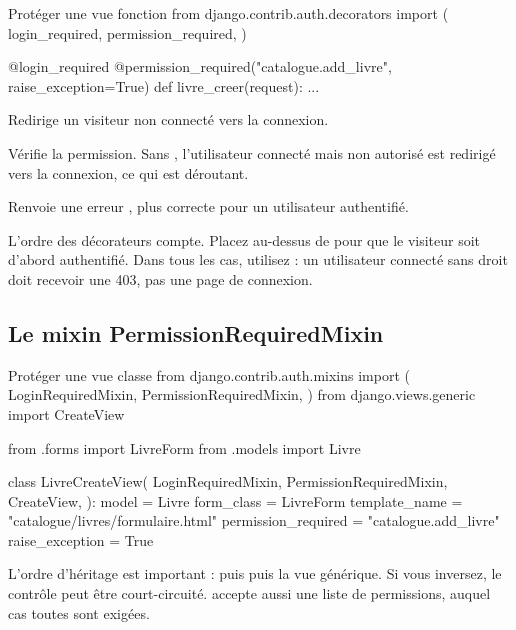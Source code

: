 \begin{codebox}[python]{Protéger une vue fonction}
from django.contrib.auth.decorators import (
    login_required,
    permission_required,
)


@login_required
@permission_required("catalogue.add_livre", raise_exception=True)
def livre_creer(request):
    ...
\end{codebox}

\begin{description}[leftmargin=4.9cm,style=nextline]
  \item[\code{login\_required}] Redirige un visiteur non connecté vers la
  connexion.
  \item[\code{permission\_required}] Vérifie la permission. Sans
  , l'utilisateur connecté mais non autorisé est redirigé
  vers la connexion, ce qui est déroutant.
  \item[\code{raise\_exception=True}] Renvoie une erreur ,
  plus correcte pour un utilisateur authentifié.
\end{description}

\begin{attention}
L'ordre des décorateurs compte. Placez  au-dessus de
 pour que le visiteur soit d'abord authentifié. Dans
tous les cas, utilisez  : un utilisateur connecté sans
droit doit recevoir une 403, pas une page de connexion.
\end{attention}

\subsection{Le mixin PermissionRequiredMixin}

\begin{codebox}[python]{Protéger une vue classe}
from django.contrib.auth.mixins import (
    LoginRequiredMixin,
    PermissionRequiredMixin,
)
from django.views.generic import CreateView

from .forms import LivreForm
from .models import Livre


class LivreCreateView(
    LoginRequiredMixin,
    PermissionRequiredMixin,
    CreateView,
):
    model = Livre
    form_class = LivreForm
    template_name = "catalogue/livres/formulaire.html"
    permission_required = "catalogue.add_livre"
    raise_exception = True
\end{codebox}

\begin{attention}
L'ordre d'héritage est important :  puis
 puis la vue générique. Si vous inversez, le contrôle
peut être court-circuité.  accepte aussi une liste de
permissions, auquel cas toutes sont exigées.
\end{attention}

